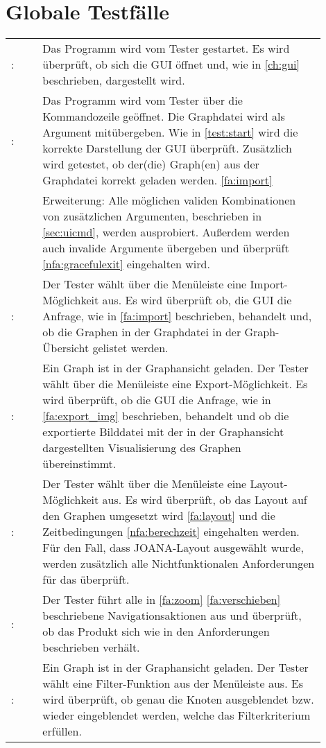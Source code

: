 \chapter{Globale Testfälle}\label{ch:test}

\setcounter{tnr}{10}
\newcommand{\testno}{\ifnum\value{tnr}<10 00\else\ifnum\value{tnr}<100 0\fi\fi\arabic{tnr}}
\newcommand\test[2]{\namedlabel{test:#1}{/T\testno/}\addtocounter{tnr}{10}: & #2 \\ [1ex] }
\newcommand\etest[3]{\namedlabel{test:#1}{/T\testno/}\addtocounter{tnr}{10}: & #2 \\ & Erweiterung: #3 \\ [1ex] }

\begin{tabular}{lp{0.9\linewidth}}
  \test{start}{Das Programm wird vom Tester gestartet.
    Es wird überprüft, ob sich die GUI öffnet und, wie in \ref{ch:gui} beschrieben, dargestellt wird.}
  \etest{startcmd}{Das Programm wird vom Tester über die Kommandozeile geöffnet.
    Die Graphdatei wird als Argument mitübergeben.
    Wie in \ref{test:start} wird die korrekte Darstellung der GUI überprüft.
    Zusätzlich wird getestet, ob der(die) Graph(en) aus der Graphdatei korrekt geladen werden. \ref{fa:import}}
    {Alle möglichen validen Kombinationen von zusätzlichen Argumenten, beschrieben in \ref{sec:uicmd}, werden ausprobiert.
    Außerdem werden auch invalide Argumente übergeben und überprüft \ref{nfa:gracefulexit} eingehalten wird.}
  \test{import}{Der Tester wählt über die Menüleiste eine Import-Möglichkeit aus.
    Es wird überprüft ob, die GUI die Anfrage, wie in \ref{fa:import} beschrieben,
    behandelt und, ob die Graphen in der Graphdatei in der Graph-Übersicht gelistet werden.}
  \test{export}{Ein Graph ist in der Graphansicht geladen.
    Der Tester wählt über die Menüleiste eine Export-Möglichkeit.
    Es wird überprüft, ob die GUI die Anfrage, wie in \ref{fa:export_img} beschrieben,
    behandelt und ob die exportierte Bilddatei mit der in der Graphansicht dargestellten Visualisierung des Graphen übereinstimmt.}
  \test{layouten}{Der Tester wählt über die Menüleiste eine Layout-Möglichkeit aus.
    Es wird überprüft, ob das Layout auf den Graphen umgesetzt wird \ref{fa:layout}
    und die Zeitbedingungen \ref{nfa:berechzeit} eingehalten werden.
    Für den Fall, dass JOANA-Layout ausgewählt wurde,
    werden zusätzlich alle Nichtfunktionalen Anforderungen für das \nameref{sec:nfajoana} überprüft.}
  \test{navigation}{Der Tester führt alle in \ref{fa:zoom} \ref{fa:verschieben} beschriebene Navigationsaktionen aus
    und überprüft, ob das Produkt sich wie in den Anforderungen beschrieben verhält.}
  \test{filter}{Ein Graph ist in der Graphansicht geladen.
    Der Tester wählt eine Filter-Funktion aus der Menüleiste aus.
    Es wird überprüft, ob genau die Knoten ausgeblendet bzw. wieder eingeblendet werden, welche das Filterkriterium erfüllen.}
\end{tabular}
